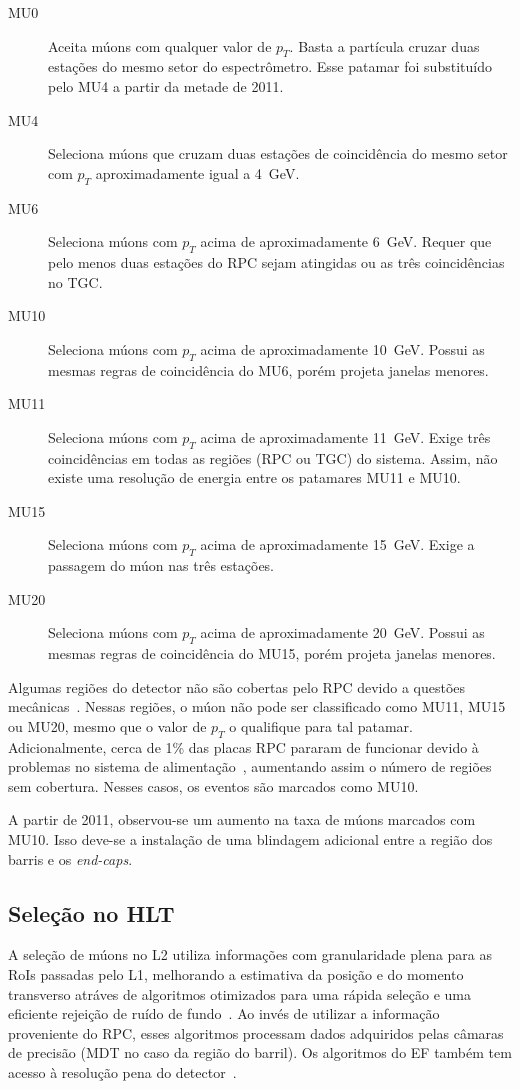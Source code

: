\begin{description}
    \item[MU0] Aceita múons com qualquer valor de $p_T$. Basta a partícula
    cruzar duas estações do mesmo setor do espectrômetro. Esse patamar foi
    substituído pelo MU4 a partir da metade de 2011.
    \item[MU4] Seleciona múons que cruzam duas estações de coincidência do mesmo
    setor com $p_T$ aproximadamente igual a 4~GeV.
    \item[MU6] Seleciona múons com $p_T$ acima de aproximadamente 6~GeV. Requer
    que pelo menos duas estações do RPC sejam atingidas ou as três coincidências
    no TGC.
    \item[MU10] Seleciona múons com $p_T$ acima de aproximadamente 10~GeV. Possui
    as mesmas regras de coincidência do MU6, porém projeta janelas menores.
    \item[MU11] Seleciona múons com $p_T$ acima de aproximadamente 11~GeV. Exige
    três coincidências em todas as regiões (RPC ou TGC) do sistema. Assim, não
    existe uma resolução de energia entre os patamares MU11 e MU10.
    \item[MU15] Seleciona múons com $p_T$ acima de aproximadamente 15~GeV. Exige
    a passagem do múon nas três estações.
    \item[MU20] Seleciona múons com $p_T$ acima de aproximadamente 20~GeV. Possui
    as mesmas regras de coincidência do MU15, porém projeta janelas menores.
\end{description}

Algumas regiões do detector não são cobertas pelo RPC devido a questões
mecânicas~\cite{MUONTDR1997}. Nessas regiões, o múon não pode ser classificado
como MU11, MU15 ou MU20, mesmo que o valor de $p_T$ o qualifique para tal
patamar. Adicionalmente, cerca de 1\% das placas RPC pararam de funcionar devido
à problemas no sistema de alimentação~\cite{ATLAS-CONF-2012-099}, aumentando
assim o número de regiões sem cobertura. Nesses casos, os eventos são marcados
como MU10.

A partir de 2011, observou-se um aumento na taxa de múons marcados com MU10.
Isso deve-se a instalação de uma blindagem adicional entre a região dos barris e
os \emph{end-caps}.

\subsection{Seleção no HLT}

A seleção de múons no L2 utiliza informações com granularidade plena para as
RoIs passadas pelo L1, melhorando a estimativa da posição e do momento
transverso atráves de algoritmos otimizados para uma rápida seleção e uma
eficiente rejeição de ruído de fundo~\cite{VENTURA2010}. Ao invés de utilizar a
informação proveniente do RPC, esses algoritmos processam dados adquiridos
pelas câmaras de precisão (MDT no caso da região do barril). Os algoritmos do EF
também tem acesso à resolução pena do detector~\cite{KORDAS2007}.


